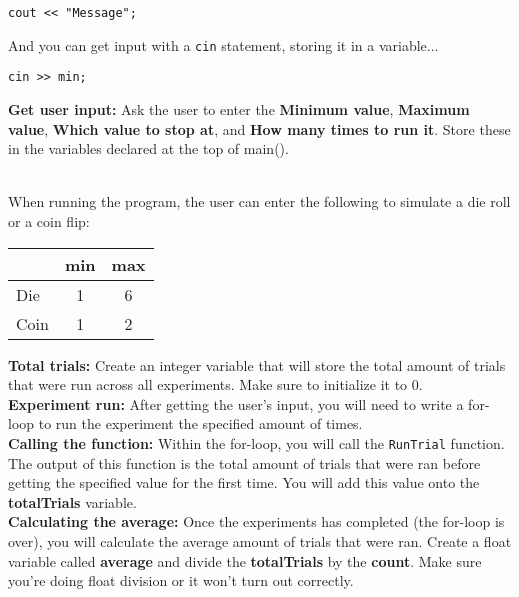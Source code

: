 \documentclass[a4paper,12pt]{book}
\begin{document}
\begin{verbatim}
cout << "Message";
\end{verbatim}

    And you can get input with a \texttt{cin} statement, storing it in a variable...

\begin{verbatim}
cin >> min;
\end{verbatim}

    \textbf{Get user input:}
    Ask the user to enter the \textbf{Minimum value}, \textbf{Maximum value},
    \textbf{Which value to stop at}, and \textbf{How many times to run it}.
    Store these in the variables declared at the top of main().

    ~\\
    When running the program, the user can enter the following to
    simulate a die roll or a coin flip:

    \begin{center}
        \begin{tabular}{ l c c }
            & min & max
            \\ \hline
            Die & 1 & 6
            \\
            Coin & 1 & 2
        \end{tabular}
    \end{center}

    \newpage


    \textbf{Total trials:}
    Create an integer variable that will store
    the total amount of trials that were run across all experiments.
    Make sure to initialize it to 0.
    ~\\
    
    \textbf{Experiment run:}
    After getting the user's input, you will need to write a for-loop
    to run the experiment the specified amount of times.
    ~\\

    \textbf{Calling the function:}
    Within the for-loop, you will call the \texttt{RunTrial} function.
    The output of this function is the total amount of trials that
    were ran before getting the specified value for the first time.
    You will add this value onto the \textbf{totalTrials} variable.
    ~\\
    
    \textbf{Calculating the average:}
    Once the experiments has completed (the for-loop is over), you will
    calculate the average amount of trials that were ran.
    Create a float variable called \textbf{average} and divide
    the \textbf{totalTrials} by the \textbf{count}.
    Make sure you're doing float division or it won't turn out correctly.
\end{document}
